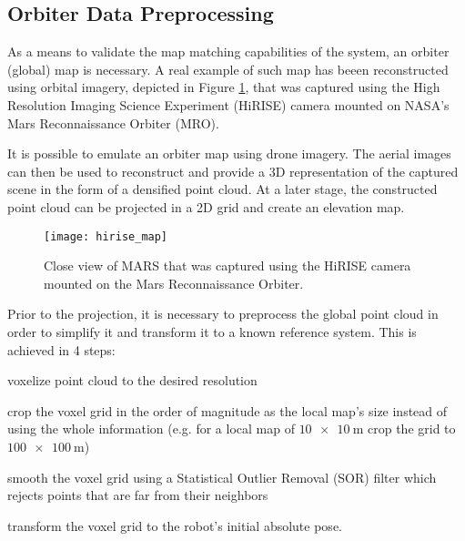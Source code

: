 
\subsection{Orbiter Data Preprocessing}

As a means to validate the map matching capabilities of the system,
an orbiter (global) map is necessary.
A real example of such map has beeen reconstructed using orbital imagery,
depicted in Figure \ref{fig:hirise_map}, that was captured using the
High Resolution Imaging Science Experiment (HiRISE) camera mounted
on NASA's Mars Reconnaissance Orbiter (MRO).

It is possible to emulate an orbiter map using drone imagery.
The aerial images can then be used to reconstruct and provide a 3D
representation of the captured scene in the form of a densified point cloud.
At a later stage, the constructed point cloud can be projected in a 2D
grid and create an elevation map.

\begin{figure}[h!]
    \centering
    \texttt{[image: hirise\_map]}
    \decoRule
    \caption[MARS view from HiRISE]{
        Close view of MARS that was captured using the HiRISE camera
        mounted on the Mars Reconnaissance Orbiter.
    }
    \label{fig:hirise_map}
\end{figure}

Prior to the projection, it is necessary to preprocess the global point cloud
in order to simplify it and transform it to a known reference system.
This is achieved in 4 steps:
\begin{enumerate*}[label=(\roman*)]
    \item voxelize point cloud to the desired resolution
    \item crop the voxel grid in the order of magnitude as the local map's
        size instead of using the whole information
        (e.g. for a local map of $\SI{10 x 10}{\m}$ crop the grid to
        $\SI{100 x 100}{\m}$)
    \item smooth the voxel grid using a Statistical Outlier Removal (SOR)
        filter which rejects points that are far from their neighbors
    \item transform the voxel grid to the robot's initial absolute pose.
\end{enumerate*}


